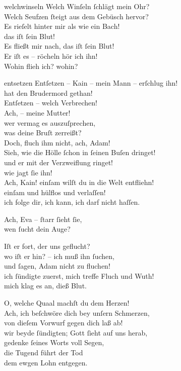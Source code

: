 \documentclass[tocstyle=ref-genre]{ees}
\begin{document}
{\begin{movement}{welchwinseln}
  \voice[Kain]
  Welch Winſeln ſchlägt mein Ohr?\\
  Welch Seufzen ſteigt aus dem Gebüsch hervor?\\
  Es rieſelt hinter mir als wie ein Bach!\\
  das iſt ſein Blut!\\
  Es fließt mir nach, das iſt ſein Blut!\\
  Er iſt es – röcheln hör ich ihn!\\
  Wohin flieh ich? wohin?
\end{movement}

\begin{movement}{entsetzen}
  \voice[Mehala]
  Entſetzen – Kain – mein Mann – erſchlug ihn!\\
  hat den Brudermord gethan!\\
  Entſetzen – welch Verbrechen!\\
  Ach, – meine Mutter!\\
  wer vermag es auszuſprechen,\\
  was deine Bruſt zerreißt?\\
  Doch, fluch ihm nicht, ach, Adam!\\
  Sieh, wie die Hölle ſchon in ſeinen Buſen dringet!\\
  und er mit der Verzweiflung ringet!\\
  wie jagt ſie ihn!\\
  Ach, Kain! einſam wilſt du in die Welt entfliehn!\\
  einſam und hülflos und verlaſſen!\\
  ich folge dir, ich kann, ich darf nicht haſſen.

  \voice[Adam]
  Ach, Eva – ſtarr ſieht ſie,\\
  wen ſucht dein Auge?

  \voice[Eva]
  Iſt er fort, der uns geflucht?\\
  wo iſt er hin? – ich muß ihn ſuchen,\\
  und ſagen, Adam nicht zu fluchen!\\
  ich ſündigte zuerst, mich treffe Fluch und Wuth!\\
  mich klag es an, dieß Blut.

  \voice[Adam]
  O, welche Quaal machſt du dem Herzen!\\
  Ach, ich beſchwöre dich bey unſern Schmerzen,\\
  von dieſem Vorwurf gegen dich laß ab!\\
  wir beyde ſündigten; Gott ſieht auf uns herab,\\
  gedenke ſeines Worts voll Segen,\\
  die Tugend führt der Tod\\
  dem ewgen Lohn entgegen.


\end{movement}}
\end{document}

